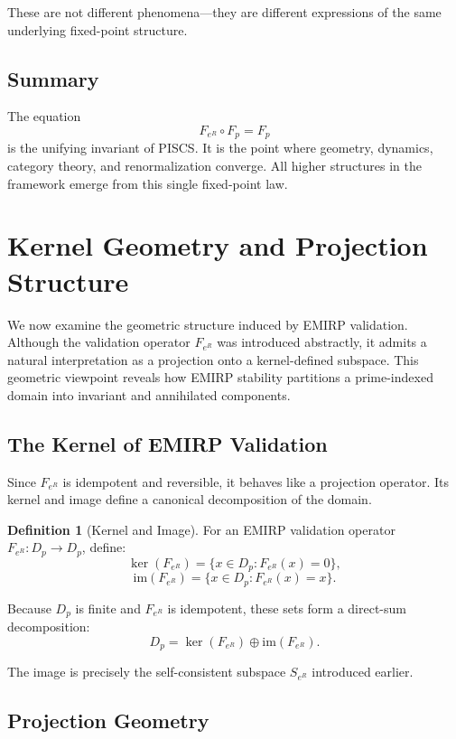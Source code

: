 \documentclass[11pt]{article}
\theoremstyle{definition}
\newtheorem{definition}{Definition}[section]
\theoremstyle{plain}
\theoremstyle{remark}
\begin{document}
These are not different phenomena—they are different expressions of the
same underlying fixed-point structure.

\subsection{Summary}

The equation
\[
F_{e^R} \circ F_p = F_p
\]
is the unifying invariant of PISCS. It is the point where geometry,
dynamics, category theory, and renormalization converge. All higher
structures in the framework emerge from this single fixed-point law.

\section{Kernel Geometry and Projection Structure}

We now examine the geometric structure induced by EMIRP validation.
Although the validation operator $F_{e^R}$ was introduced abstractly, it
admits a natural interpretation as a projection onto a kernel-defined
subspace. This geometric viewpoint reveals how EMIRP stability partitions
a prime-indexed domain into invariant and annihilated components.

\subsection{The Kernel of EMIRP Validation}

Since $F_{e^R}$ is idempotent and reversible, it behaves like a
projection operator. Its kernel and image define a canonical
decomposition of the domain.

\begin{definition}[Kernel and Image]
For an EMIRP validation operator $F_{e^R} : D_p \to D_p$, define:
\[
\ker(F_{e^R}) = \{ x \in D_p : F_{e^R}(x) = 0 \},
\]
\[
\mathrm{im}(F_{e^R}) = \{ x \in D_p : F_{e^R}(x) = x \}.
\]
\end{definition}

Because $D_p$ is finite and $F_{e^R}$ is idempotent, these sets form a
direct-sum decomposition:
\[
D_p = \ker(F_{e^R}) \oplus \mathrm{im}(F_{e^R}).
\]

The image is precisely the self-consistent subspace $S_{e^R}$ introduced
earlier.

\subsection{Projection Geometry}
\end{document}
